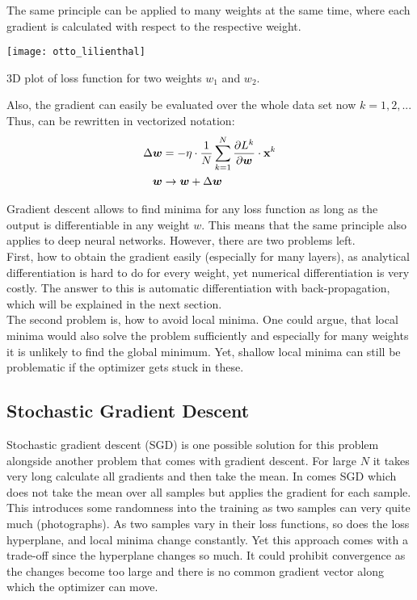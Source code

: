 The same principle can be applied to many weights at the same time, where each gradient is calculated with respect to the respective weight.
\begin{marginfigure}
    \texttt{[image: otto\_lilienthal]}
    \caption[]{3D plot of loss function for two  weights $w_1$ and $w_2$.}
\end{marginfigure}
Also, the gradient can easily be evaluated over the whole data set now $k = 1, 2,...$
Thus,  can be rewritten in vectorized notation:
\begin{align}
    \Delta \boldsymbol{w} & = - \eta \cdot \frac{1}{N} \sum_{k=1}^{N} \frac{\partial L^k}{\partial \boldsymbol{w}} \cdot \mathbf{x}^k \\
    \boldsymbol{w} & \rightarrow \boldsymbol{w} + \Delta \boldsymbol{w}
\end{align}

Gradient descent allows to find minima for any loss function as long as the output is differentiable in any weight $w$.
This means that the same principle also applies to deep neural networks.
However, there are two problems left.\\
First, how to obtain the gradient easily (especially for many layers), as analytical differentiation is hard to do for every weight, yet numerical differentiation\cite{numerical_diff} is very costly.
The answer to this is automatic differentiation with back-propagation, which will be explained in the next section.\\
The second problem is, how to avoid local minima.
One could argue, that local minima would also solve the problem sufficiently and especially for many weights it is unlikely to find the global minimum.
Yet, shallow local minima can still be problematic if the optimizer gets stuck in these.

\subsection{Stochastic Gradient Descent}
Stochastic gradient descent (SGD) is one possible solution for this problem alongside another problem that comes with gradient descent.
For large $N$ it takes very long calculate all gradients and then take the mean.
In comes SGD which does not take the mean over all samples but applies the gradient for each sample.\\
This introduces some randomness into the training as two samples can very quite much (\eg photographs).
As two samples vary in their loss functions, so does the loss hyperplane, and local minima change constantly.
Yet this approach comes with a trade-off since the hyperplane changes so much.
It could prohibit convergence as the changes become too large and there is no common gradient vector along which the optimizer can move.

